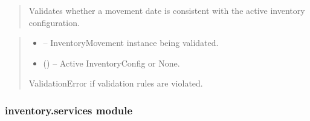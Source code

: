 \documentclass[a4paper,11pt,spanish]{sphinxmanual}
\begin{document}

\begin{fulllineitems}
\label{\detokenize{api/inventory/inventory.models:inventory.models.validate_cutoff_for_movement}}
\pysigstartsignatures
\pysiglinewithargsret
{}
{\sphinxparamcomma {}}
{}
\pysigstopsignatures\begin{quote}

\sphinxAtStartPar
Validates whether a movement date is consistent with the active inventory configuration.
\end{quote}
\begin{quote}\begin{description}
\begin{itemize}
\item {} 
\sphinxAtStartPar
{} – InventoryMovement instance being validated.

\item {} 
\sphinxAtStartPar
{} ({\hyperref[\detokenize{api/inventory/inventory.models:inventory.models.InventoryConfig}]{}}\sphinxstyleliteralemphasis{\sphinxupquote{ | }}) – Active InventoryConfig or None.

\end{itemize}

\sphinxAtStartPar
ValidationError if validation rules are violated.

\end{description}\end{quote}

\end{fulllineitems}


\sphinxstepscope


\subsubsection{inventory.services module}
\label{\detokenize{api/inventory/inventory.services:module-inventory.services}}\label{\detokenize{api/inventory/inventory.services:inventory-services-module}}\label{\detokenize{api/inventory/inventory.services::doc}}
\end{document}
